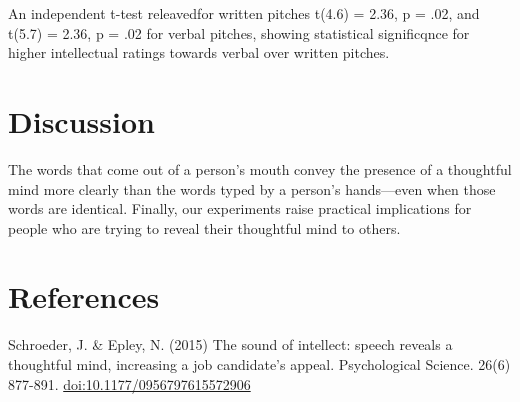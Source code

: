 \documentclass[man]{apa6}
\begin{document}
An independent t-test releavedfor written pitches t(4.6) = 2.36, p =
.02, and t(5.7) = 2.36, p = .02 for verbal pitches, showing statistical
significqnce for higher intellectual ratings towards verbal over written
pitches.

\section{Discussion}\label{discussion}

The words that come out of a person's mouth convey the presence of a
thoughtful mind more clearly than the words typed by a person's
hands---even when those words are identical. Finally, our experiments
raise practical implications for people who are trying to reveal their
thoughtful mind to others.

\newpage

\section{References}\label{references}

Schroeder, J. \& Epley, N. (2015) The sound of intellect: speech reveals
a thoughtful mind, increasing a job candidate's appeal. Psychological
Science. 26(6) 877-891. \url{doi:10.1177/0956797615572906}

\begingroup
\setlength{\parindent}{-0.5in} \setlength{\leftskip}{0.5in}

\hypertarget{refs}{}

\endgroup
\end{document}
